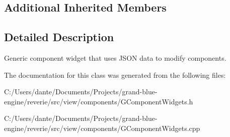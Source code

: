 \subsection*{Additional Inherited Members}


\subsection{Detailed Description}
Generic component widget that uses J\+S\+ON data to modify components. 

The documentation for this class was generated from the following files\+:\begin{DoxyCompactItemize}
\item 
C\+:/\+Users/dante/\+Documents/\+Projects/grand-\/blue-\/engine/reverie/src/view/components/G\+Component\+Widgets.\+h\item 
C\+:/\+Users/dante/\+Documents/\+Projects/grand-\/blue-\/engine/reverie/src/view/components/G\+Component\+Widgets.\+cpp\end{DoxyCompactItemize}
